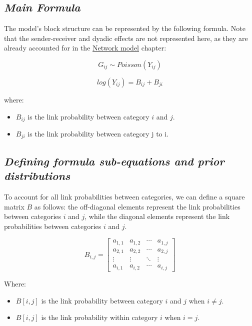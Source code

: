 \documentclass[
  letterpaper,
  DIV=11,
  numbers=noendperiod]{scrreprt}
\providecommand{\tightlist}{%
  \setlength{\itemsep}{0pt}\setlength{\parskip}{0pt}}\usepackage{longtable,booktabs,array}
\begin{document}
\subsection{\texorpdfstring{\emph{Main
Formula}}{Main Formula}}\label{main-formula-1}

The model's block structure can be represented by the following formula.
Note that the sender-receiver and dyadic effects are not represented
here, as they are already accounted for in the
\href{18.\%20Network\%20model.qmd}{Network model} chapter:

\[
G_{ij} \sim Poisson(Y_{ij})
\]

\[
log(Y_{ij}) =  B_{ij} + B_{ji}
\]

where:

\begin{itemize}
\tightlist
\item
  \(B_{ij}\) is the link probability between category \(i\) and \(j\).
\item
  \(B_{ji}\) is the link probability between category j to i.
\end{itemize}

\subsection{\texorpdfstring{\emph{Defining formula sub-equations and
prior
distributions}}{Defining formula sub-equations and prior distributions}}\label{defining-formula-sub-equations-and-prior-distributions-1}

To account for all link probabilities between categories, we can define
a square matrix \(B\) as follows: the off-diagonal elements represent
the link probabilities between categories \(i\) and \(j\), while the
diagonal elements represent the link probabilities between categories
\(i\) and \(j\).

\[
B_{i,j} = 
\begin{bmatrix}
a_{1,1} & a_{1,2} & \cdots & a_{1,j} \\
a_{2,1} & a_{2,2} & \cdots & a_{2,j} \\
\vdots  & \vdots  & \ddots & \vdots  \\
a_{i,1} & a_{i,2} & \cdots & a_{i,j} 
\end{bmatrix}
\]

Where:

\begin{itemize}
\tightlist
\item
  \(B[i,j]\) is the link probability between category \(i\) and \(j\)
  when \(i \neq j\).
\item
  \(B[i,j]\) is the link probability within category \(i\) when
  \(i = j\).
\end{itemize}
\end{document}
